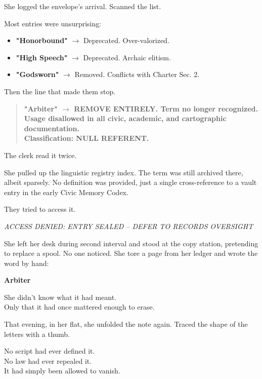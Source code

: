 \documentclass[9pt]{article}
\begin{document}
She logged the envelope’s arrival. Scanned the list.

Most entries were unsurprising:
\begin{itemize}
    \item \textbf{"Honorbound"} $\rightarrow$ Deprecated. Over-valorized.
    \item \textbf{"High Speech"} $\rightarrow$ Deprecated. Archaic elitism.
    \item \textbf{"Godsworn"} $\rightarrow$ Removed. Conflicts with Charter Sec. 2.
\end{itemize}

Then the line that made them stop.

\begin{quote}
\textbf{"Arbiter" $\rightarrow$ REMOVE ENTIRELY. Term no longer recognized. Usage disallowed in all civic, academic, and cartographic documentation.} \\
\textbf{Classification: NULL REFERENT.}
\end{quote}

The clerk read it twice.

She pulled up the linguistic registry index. The term was still archived there, albeit sparsely. No definition was provided, just a single cross-reference to a vault entry in the early Civic Memory Codex.

They tried to access it.

\textit{ACCESS DENIED: ENTRY SEALED – DEFER TO RECORDS OVERSIGHT}

\vspace{1em}

She left her desk during second interval and stood at the copy station, pretending to replace a spool. No one noticed. She tore a page from her ledger and wrote the word by hand:

\begin{center}
\textbf{Arbiter}
\end{center}

She didn’t know what it had meant.\\
Only that it had once mattered enough to erase.

\vspace{1em}

That evening, in her flat, she unfolded the note again. Traced the shape of the letters with a thumb.

No script had ever defined it.\\
No law had ever repealed it.\\
It had simply been allowed to vanish.
\end{document}
